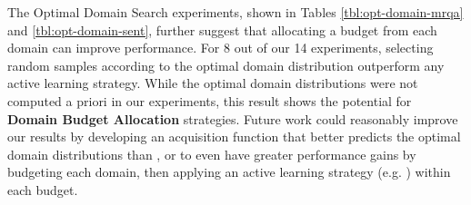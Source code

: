     The Optimal Domain Search experiments, shown in Tables \ref{tbl:opt-domain-mrqa} and \ref{tbl:opt-domain-sent}, further suggest that allocating a budget from each domain can improve performance. 
    For 8 out of our 14 experiments, selecting random samples according to the optimal domain distribution outperform any active learning strategy. 
    While the optimal domain distributions were not computed a priori in our experiments, this result shows the potential for \textbf{Domain Budget Allocation} strategies. 
    Future work could reasonably improve our results by developing an acquisition function that better predicts the optimal domain distributions than \rcas{}, or to even have greater performance gains by budgeting each domain, then applying an active learning strategy (e.g. \dale{}) within each budget.
   
    
    